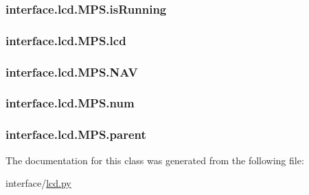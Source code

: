 \subsubsection[{is\+Running}]{\setlength{\rightskip}{0pt plus 5cm}interface.\+lcd.\+M\+P\+S.\+is\+Running}\label{classinterface_1_1lcd_1_1MPS_ac189498130bd20b2aa2f6d5ec9c48210}
\hypertarget{classinterface_1_1lcd_1_1MPS_ac3601f1dd283764baca481f596f6ca40}{}
\subsubsection[{lcd}]{\setlength{\rightskip}{0pt plus 5cm}interface.\+lcd.\+M\+P\+S.\+lcd}\label{classinterface_1_1lcd_1_1MPS_ac3601f1dd283764baca481f596f6ca40}
\hypertarget{classinterface_1_1lcd_1_1MPS_a128ad75cc77e06e9621cb8a8d2e4a6e7}{}
\subsubsection[{N\+A\+V}]{\setlength{\rightskip}{0pt plus 5cm}interface.\+lcd.\+M\+P\+S.\+N\+A\+V}\label{classinterface_1_1lcd_1_1MPS_a128ad75cc77e06e9621cb8a8d2e4a6e7}
\hypertarget{classinterface_1_1lcd_1_1MPS_a698ac3f1e12c9d6c893c135d06252f66}{}
\subsubsection[{num}]{\setlength{\rightskip}{0pt plus 5cm}interface.\+lcd.\+M\+P\+S.\+num}\label{classinterface_1_1lcd_1_1MPS_a698ac3f1e12c9d6c893c135d06252f66}
\hypertarget{classinterface_1_1lcd_1_1MPS_a1d739a8338d7a795b4efa322d08f2808}{}
\subsubsection[{parent}]{\setlength{\rightskip}{0pt plus 5cm}interface.\+lcd.\+M\+P\+S.\+parent}\label{classinterface_1_1lcd_1_1MPS_a1d739a8338d7a795b4efa322d08f2808}


The documentation for this class was generated from the following file\+:\begin{DoxyCompactItemize}
\item 
interface/\hyperlink{lcd_8py}{lcd.\+py}\end{DoxyCompactItemize}
